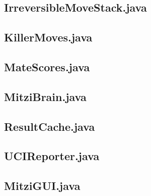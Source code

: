 \documentclass [12pt ,a4paper, english]{scrartcl}
\theoremstyle{plain}
\theoremstyle{definition}
\theoremstyle{remark}
\begin{document}
\subsection{IrreversibleMoveStack.java}


\subsection{KillerMoves.java}


\subsection{MateScores.java}


\subsection{MitziBrain.java}


\subsection{ResultCache.java}


\subsection{UCIReporter.java}


\subsection{MitziGUI.java}

\end{document}
